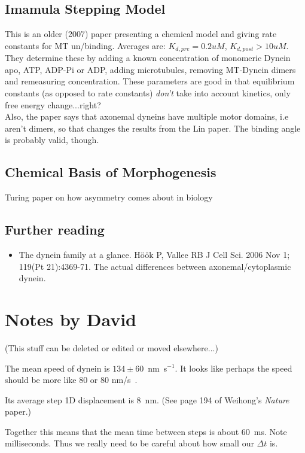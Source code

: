 \documentclass[10pt]{article} %
\begin{document}
\subsection{Imamula Stepping Model}
This is an older (2007) paper presenting a chemical model and giving rate constants for MT un/binding. Averages are: $K_{d,pre} = 0.2uM$, $K_{d,post} > 10uM$. They determine these by adding a known concentration of monomeric Dynein apo, ATP, ADP-Pi or ADP, adding microtubules, removing MT-Dynein dimers and remeasuring concentration. These parameters are good in that equilibrium constants (as opposed to rate constants) \textit{don't} take into account kinetics, only free energy change...right?\\

Also, the paper says that axonemal dyneins have multiple motor domains, i.e aren't dimers, so that changes the results from the Lin paper. The binding angle is probably valid, though.\\

\subsection{Chemical Basis of Morphogenesis}
Turing paper on how asymmetry comes about in biology\\



\subsection{Further reading}
\begin{itemize}
\item The dynein family at a glance. Höök P, Vallee RB J Cell Sci. 2006 Nov 1; 119(Pt 21):4369-71. The actual differences between axonemal/cytoplasmic dynein.
\end{itemize}

\section{Notes by David}
(This stuff can be deleted or edited or moved elsewhere...)

The mean speed of dynein is $134\pm 60$~nm~s$^{-1}$.  It looks like
perhaps the speed should be more like 80 or 80 nm/s~\cite{reck2006single}.

Its average step 1D displacement is 8~nm. (See page 194 of Weihong's \emph{Nature} paper.)

Together this means that the mean time between steps is about 60~ms.
Note milliseconds.  Thus we really need to be careful about how small
our $\Delta t$ is.
\end{document}
